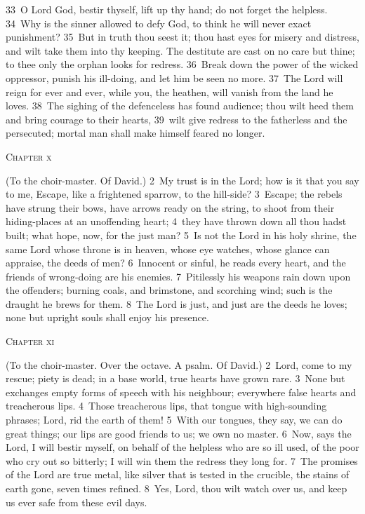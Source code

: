 \documentclass[10pt]{book} %
\begin{document}
\textcolor{benred8}{33}~O Lord God, bestir thyself, lift up thy hand; do not forget the helpless. \textcolor{benred8}{34}~Why is the sinner allowed to defy God, to think he will never exact punishment? \textcolor{benred8}{35}~But in truth thou seest it; thou hast eyes for misery and distress, and wilt take them into thy keeping. The destitute are cast on no care but thine; to thee only the orphan looks for redress. \textcolor{benred8}{36}~Break down the power of the wicked oppressor, punish his ill-doing, and let him be seen no more. \textcolor{benred8}{37}~The Lord will reign for ever and ever, while you, the heathen, will vanish from the land he loves. \textcolor{benred8}{38}~The sighing of the defenceless has found audience; thou wilt heed them and bring courage to their hearts, \textcolor{benred8}{39}~wilt give redress to the fatherless and the persecuted; mortal man shall make himself feared no longer.
\begin{large}\begin{center}\textsc{Chapter x}\end{center}\end{large}
(To the choir-master. Of David.)
\textcolor{benred8}{2}~My trust is in the Lord; how is it that you say to me, Escape, like a frightened sparrow, to the hill-side? \textcolor{benred8}{3}~Escape; the rebels have strung their bows, have arrows ready on the string, to shoot from their hiding-places at an unoffending heart; \textcolor{benred8}{4}~they have thrown down all thou hadst built; what hope, now, for the just man?
\textcolor{benred8}{5}~Is not the Lord in his holy shrine, the same Lord whose throne is in heaven, whose eye watches, whose glance can appraise, the deeds of men? \textcolor{benred8}{6}~Innocent or sinful, he reads every heart, and the friends of wrong-doing are his enemies. \textcolor{benred8}{7}~Pitilessly his weapons rain down upon the offenders; burning coals, and brimstone, and scorching wind; such is the draught he brews for them. \textcolor{benred8}{8}~The Lord is just, and just are the deeds he loves; none but upright souls shall enjoy his presence.
\begin{large}\begin{center}\textsc{Chapter xi}\end{center}\end{large}
(To the choir-master. Over the octave. A psalm. Of David.)
\textcolor{benred8}{2}~Lord, come to my rescue; piety is dead; in a base world, true hearts have grown rare. \textcolor{benred8}{3}~None but exchanges empty forms of speech with his neighbour; everywhere false hearts and treacherous lips. \textcolor{benred8}{4}~Those treacherous lips, that tongue with high-sounding phrases; Lord, rid the earth of them! \textcolor{benred8}{5}~With our tongues, they say, we can do great things; our lips are good friends to us; we own no master. \textcolor{benred8}{6}~Now, says the Lord, I will bestir myself, on behalf of the helpless who are so ill used, of the poor who cry out so bitterly; I will win them the redress they long for. \textcolor{benred8}{7}~The promises of the Lord are true metal, like silver that is tested in the crucible, the stains of earth gone, seven times refined. \textcolor{benred8}{8}~Yes, Lord, thou wilt watch over us, and keep us ever safe from these evil days.
\end{document}
